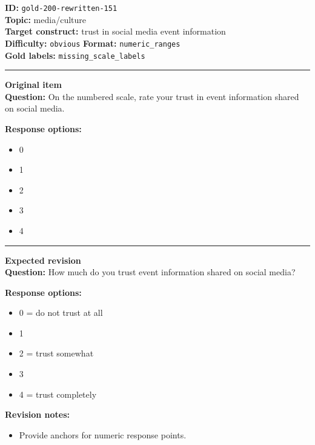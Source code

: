 \documentclass[10pt,a4paper]{article}
\newcommand{\sectionline}{\vspace{0.15em}\hrule\vspace{0.35em}}
\begin{document}
\begin{tcolorbox}[colframe=FlawRed,colback=white,colbacktitle=FlawRed!9,coltitle=black,title={Item 151\hfill Flawed item}]
\textbf{ID:} \texttt{gold-200-rewritten-151}\\
\textbf{Topic:} media/culture\\
\textbf{Target construct:} trust in social media event information\\
\textbf{Difficulty:} \texttt{obvious} \quad \textbf{Format:} \texttt{numeric\_ranges}\\
\textbf{Gold labels:} \texttt{missing\_scale\_labels}\\
\sectionline
\textbf{Original item}\\
\textbf{Question:} On the numbered scale, rate your trust in event information shared on social media.
\par\textbf{Response options:}
\begin{itemize}
\item 0
\item 1
\item 2
\item 3
\item 4
\end{itemize}
\sectionline
\textbf{Expected revision}\\
\textbf{Question:} How much do you trust event information shared on social media?
\par\textbf{Response options:}
\begin{itemize}
\item 0 = do not trust at all
\item 1
\item 2 = trust somewhat
\item 3
\item 4 = trust completely
\end{itemize}
\par\textbf{Revision notes:}
\begin{itemize}
\item Provide anchors for numeric response points.
\end{itemize}
\end{tcolorbox}
\end{document}
